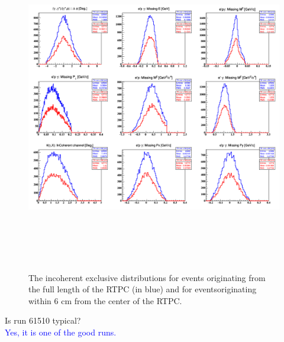 \begin{figure}[tbp]
\centering
\includegraphics[height=14.5cm]{fig/incoh_exc_cuts_z.png}
\caption{The incoherent exclusive distributions for events 
originating from the full length of the RTPC (in blue) and for 
eventsoriginating within 6 cm from the center 
of the RTPC.}
\label{fig:incoh_exc_cuts_z}
 \end{figure}



Is run 61510 typical? \\
\textcolor{blue}{
   Yes, it is one of the good runs.  }\\

